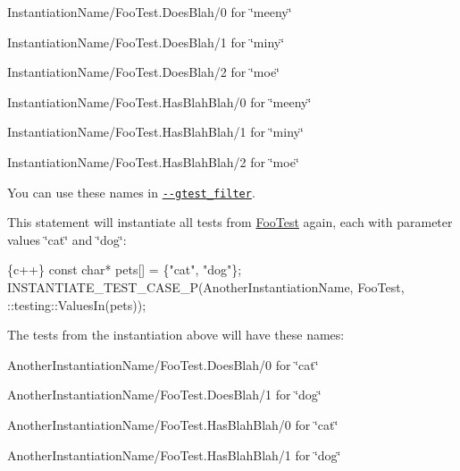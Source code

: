 \begin{DoxyItemize}
\item {\ttfamily Instantiation\+Name/\+Foo\+Test.\+Does\+Blah/0} for {\ttfamily \char`\"{}meeny\char`\"{}}
\item {\ttfamily Instantiation\+Name/\+Foo\+Test.\+Does\+Blah/1} for {\ttfamily \char`\"{}miny\char`\"{}}
\item {\ttfamily Instantiation\+Name/\+Foo\+Test.\+Does\+Blah/2} for {\ttfamily \char`\"{}moe\char`\"{}}
\item {\ttfamily Instantiation\+Name/\+Foo\+Test.\+Has\+Blah\+Blah/0} for {\ttfamily \char`\"{}meeny\char`\"{}}
\item {\ttfamily Instantiation\+Name/\+Foo\+Test.\+Has\+Blah\+Blah/1} for {\ttfamily \char`\"{}miny\char`\"{}}
\item {\ttfamily Instantiation\+Name/\+Foo\+Test.\+Has\+Blah\+Blah/2} for {\ttfamily \char`\"{}moe\char`\"{}}
\end{DoxyItemize}

You can use these names in \href{#running-a-subset-of-the-tests}{\tt {\ttfamily -\/-\/gtest\+\_\+filter}}.

This statement will instantiate all tests from {\ttfamily \hyperlink{classFooTest}{Foo\+Test}} again, each with parameter values {\ttfamily \char`\"{}cat\char`\"{}} and {\ttfamily \char`\"{}dog\char`\"{}}\+:


\begin{DoxyCode}
\{c++\}
const char* pets[] = \{"cat", "dog"\};
INSTANTIATE\_TEST\_CASE\_P(AnotherInstantiationName, FooTest,
                        ::testing::ValuesIn(pets));
\end{DoxyCode}


The tests from the instantiation above will have these names\+:


\begin{DoxyItemize}
\item {\ttfamily Another\+Instantiation\+Name/\+Foo\+Test.\+Does\+Blah/0} for {\ttfamily \char`\"{}cat\char`\"{}}
\item {\ttfamily Another\+Instantiation\+Name/\+Foo\+Test.\+Does\+Blah/1} for {\ttfamily \char`\"{}dog\char`\"{}}
\item {\ttfamily Another\+Instantiation\+Name/\+Foo\+Test.\+Has\+Blah\+Blah/0} for {\ttfamily \char`\"{}cat\char`\"{}}
\item {\ttfamily Another\+Instantiation\+Name/\+Foo\+Test.\+Has\+Blah\+Blah/1} for {\ttfamily \char`\"{}dog\char`\"{}}
\end{DoxyItemize}

